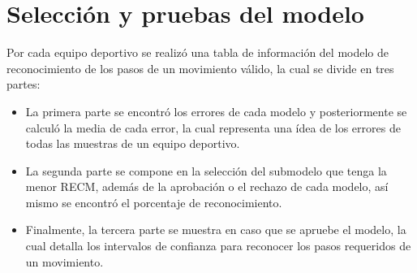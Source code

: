 \section{Selecci\'on y pruebas del modelo} \label{res:chooseModel}
Por cada equipo deportivo se realiz\'o una tabla de informaci\'on del modelo de reconocimiento de los pasos de un movimiento v\'alido, la cual se divide en tres partes:
\begin{itemize}
\item  La primera parte se encontr\'o los errores de cada modelo y posteriormente se calcul\'o la media de cada error, la cual representa una \'idea de los  errores de todas las muestras de un equipo deportivo.
\item  La segunda parte se compone en la selecci\'on del submodelo que tenga la menor RECM, adem\'as de la aprobaci\'on o el rechazo de cada modelo,  as\'i mismo se encontr\'o el porcentaje de reconocimiento.
\item Finalmente, la tercera parte se muestra en caso que se apruebe el modelo, la cual detalla los intervalos de confianza para reconocer los pasos requeridos  de un movimiento.
\end{itemize}
